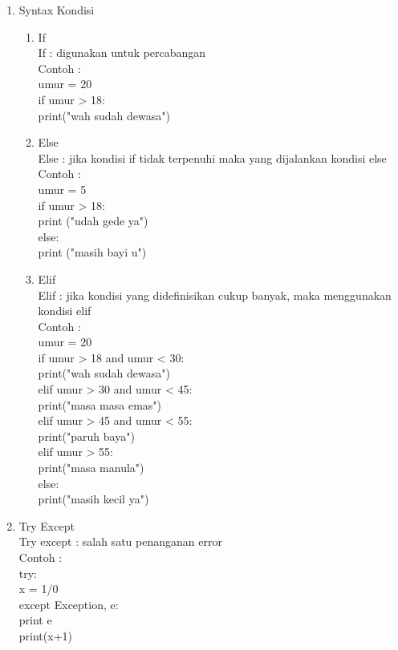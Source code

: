 \begin{enumerate}
\item Syntax Kondisi\\
\begin{enumerate}[label=\alph*.]
\item If\\
If : digunakan untuk percabangan\\
Contoh :\\
umur = 20\\
if umur > 18:\\
    print("wah sudah dewasa")\\
\item Else\\
Else : jika kondisi if tidak terpenuhi maka yang dijalankan kondisi else\\
Contoh :\\
umur = 5\\
if umur > 18:\\
    print ("udah gede ya")\\
else:\\
    print ("masih bayi u")\\
\item Elif\\
Elif : jika kondisi yang didefinisikan cukup banyak, maka menggunakan kondisi elif\\
Contoh :\\
umur = 20\\
if umur > 18 and umur < 30:\\
    print("wah sudah dewasa")\\
elif umur > 30 and umur < 45:\\
    print("masa masa emas")\\
elif umur > 45 and umur < 55:\\
    print("paruh baya")\\
elif umur > 55:\\
    print("masa manula")\\
else:\\
    print("masih kecil ya")\\
\end{enumerate}

\item Try Except\\
Try except : salah satu penanganan error\\
Contoh :\\
try:\\
	x = 1/0\\
except Exception, e:\\
	print e\\

print(x+1)
\end{enumerate}


